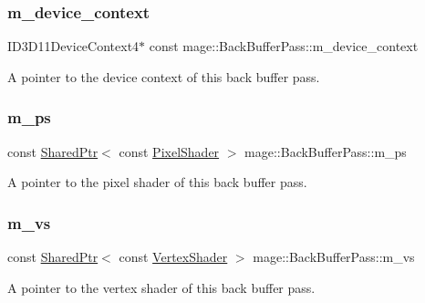 \subsubsection{\texorpdfstring{m\+\_\+device\+\_\+context}{m\_device\_context}}
{\footnotesize\ttfamily I\+D3\+D11\+Device\+Context4$\ast$ const mage\+::\+Back\+Buffer\+Pass\+::m\+\_\+device\+\_\+context\hspace{0.3cm}{\ttfamily [private]}}

A pointer to the device context of this back buffer pass. \hypertarget{classmage_1_1_back_buffer_pass_a3890afe2710539dfe25ce95be802c2fc}{}\label{classmage_1_1_back_buffer_pass_a3890afe2710539dfe25ce95be802c2fc} 
\subsubsection{\texorpdfstring{m\+\_\+ps}{m\_ps}}
{\footnotesize\ttfamily const \hyperlink{namespacemage_a1e01ae66713838a7a67d30e44c67703e}{Shared\+Ptr}$<$ const \hyperlink{namespacemage_a27ecaf266420ee7a494d64edc0757129}{Pixel\+Shader} $>$ mage\+::\+Back\+Buffer\+Pass\+::m\+\_\+ps\hspace{0.3cm}{\ttfamily [private]}}

A pointer to the pixel shader of this back buffer pass. \hypertarget{classmage_1_1_back_buffer_pass_ac2117930285072c5063881124ba38a5f}{}\label{classmage_1_1_back_buffer_pass_ac2117930285072c5063881124ba38a5f} 
\subsubsection{\texorpdfstring{m\+\_\+vs}{m\_vs}}
{\footnotesize\ttfamily const \hyperlink{namespacemage_a1e01ae66713838a7a67d30e44c67703e}{Shared\+Ptr}$<$ const \hyperlink{classmage_1_1_vertex_shader}{Vertex\+Shader} $>$ mage\+::\+Back\+Buffer\+Pass\+::m\+\_\+vs\hspace{0.3cm}{\ttfamily [private]}}

A pointer to the vertex shader of this back buffer pass. 